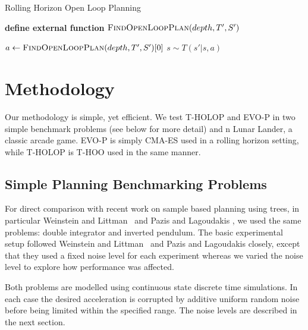 \documentclass[conference]{IEEEtran}
\newcommand{\mathsc}[1]{{\normalfont\textsc{#1}}}
\begin{document}
\begin{algorithm}[!ht]
\caption{Rolling Horizon Open Loop Planning}\label{algo:ooop}
\begin{algorithmic}

\State 	\textbf{define external function} $\mathsc{FindOpenLoopPlan} (depth, T',S') $ 


	\Procedure{$\mathsc{OOP}$} {}
		    \State $a \gets \mathsc{FindOpenLoopPlan}(depth, T',S')[0]$ 
		    \State $s \sim T(s'|s,a)$ 
		\EndWhile
		\State
	\EndProcedure



\end{algorithmic}
\end{algorithm}


\section{Methodology} \label{sec:methodology}
Our methodology is simple, yet efficient. We test T-HOLOP and EVO-P in two simple benchmark problems (see below for more detail) and n Lunar Lander, a classic arcade game. EVO-P is simply CMA-ES used in a rolling horizon setting, while T-HOLOP is T-HOO used in the same manner.  


\subsection{Simple Planning Benchmarking Problems}





For direct comparison with recent work on sample based planning using trees, in particular
Weinstein and Littman~\cite{weinstein2012bandit} and Pazis and Lagoudakis \cite{PazisBAS},
we used the same problems: double integrator and inverted pendulum.  The basic
experimental setup followed Weinstein and Littman~\cite{weinstein2012bandit}
and Pazis and Lagoudakis \cite{PazisBAS}
closely, except that they used a fixed noise level for each experiment whereas we varied the
noise level to explore how performance was affected.

Both problems are modelled
using continuous state discrete time simulations.  In each case the desired
acceleration is corrupted by additive uniform random noise
before being limited within the specified range.  The noise levels are described in the next section.
\end{document}
